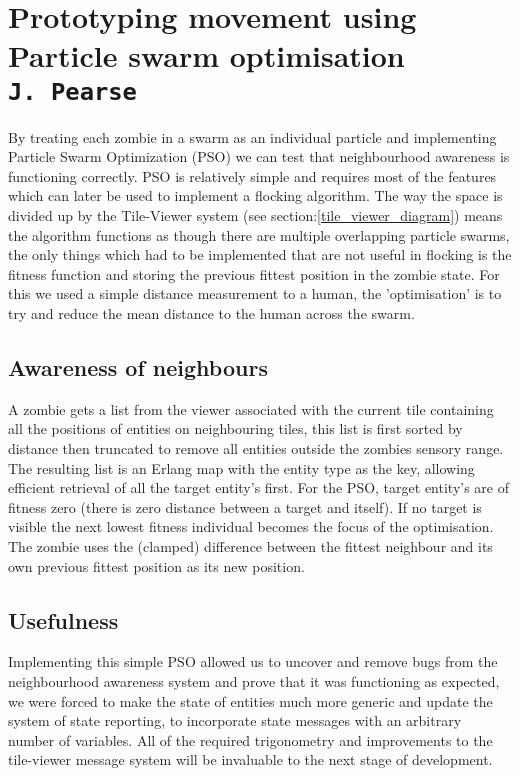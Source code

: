\pagestyle{empty}

\section{Prototyping movement using Particle swarm optimisation\\{\small\tt{J.~Pearse}}}
\label{pso}
By treating each zombie in a swarm as an individual particle and implementing Particle Swarm Optimization (PSO) we can test that neighbourhood awareness is functioning correctly. PSO is relatively simple and requires most of the features which can later be used to implement a flocking algorithm. The way the space is divided up by the Tile-Viewer system (see section:\ref{tile_viewer_diagram}) means the algorithm functions as though there are multiple overlapping particle swarms, the only things which had to be implemented that are not useful in flocking is the fitness function and storing the previous fittest position in the zombie state. For this we used a simple distance measurement to a human, the 'optimisation' is to try and reduce the mean distance to the human across the swarm. 

\subsection{Awareness of neighbours}
A zombie gets a list from the viewer associated with the current tile containing all the positions of entities on neighbouring tiles, this list is first sorted by distance  then truncated to remove all entities outside the zombies sensory range. The resulting list is an Erlang map with the entity type as the key, allowing efficient retrieval of all the target entity’s first. For the PSO, target entity's are of fitness zero (there is zero distance between a target and itself). If no target is visible the next lowest fitness individual becomes the focus of the optimisation. The zombie uses the (clamped) difference between the fittest neighbour and its own previous fittest position as its new position.

\subsection{Usefulness}
Implementing this simple PSO allowed us to uncover and remove bugs from the neighbourhood awareness system and prove that it was functioning as expected, we were forced to make the state of entities much more generic and update the system of state reporting, to incorporate state messages with an arbitrary number of variables. All of the required trigonometry and improvements to the tile-viewer message system will be invaluable to the next stage of development. 


